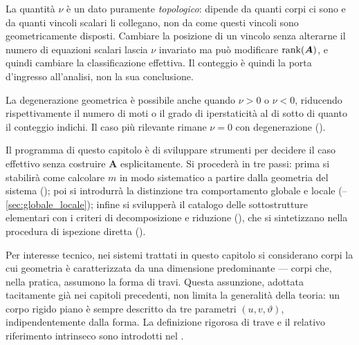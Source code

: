 \begin{oss}
	La quantità $\nu$ è un dato puramente \emph{topologico}: dipende
	da quanti corpi ci sono e da quanti vincoli scalari li collegano,
	non da come questi vincoli sono geometricamente disposti.
	Cambiare la posizione di un vincolo senza alterarne il numero
	di equazioni scalari lascia $\nu$ invariato ma può modificare
	$\operatorname{rank}(\bm{A})$, e quindi cambiare la classificazione effettiva.
	Il conteggio è quindi la porta d'ingresso
	all'analisi, non la sua conclusione.
\end{oss}

\begin{oss}
	La degenerazione geometrica è possibile anche quando $\nu > 0$
	o $\nu < 0$, riducendo rispettivamente il numero di moti o il
	grado di iperstaticità al di sotto di quanto il conteggio indichi.
	Il caso più rilevante rimane $\nu = 0$ con degenerazione
	().
\end{oss}

Il programma di questo capitolo è di sviluppare strumenti
per decidere il caso effettivo senza costruire $\bm{A}$
esplicitamente. Si procederà in tre passi: prima si stabilirà
come calcolare $m$ in modo sistematico a partire dalla geometria
del sistema (); poi si introdurrà la
distinzione tra comportamento globale e locale
(--\ref{sec:globale_locale});
infine si svilupperà il catalogo delle sottostrutture elementari
con i criteri di decomposizione e riduzione
(), che si sintetizzano nella procedura
di ispezione diretta ().

\begin{oss}
	Per interesse tecnico, nei sistemi trattati in questo capitolo
	si considerano corpi la cui geometria è caratterizzata da una
	dimensione predominante --- corpi che, nella pratica, assumono
	la forma di travi. Questa assunzione, adottata tacitamente già
	nei capitoli precedenti, non limita la generalità della teoria:
	un corpo rigido piano è sempre descritto da tre parametri
	$(u, v, \vartheta)$, indipendentemente dalla forma. La
	definizione rigorosa di trave e il relativo riferimento
	intrinseco sono introdotti nel .
\end{oss}


